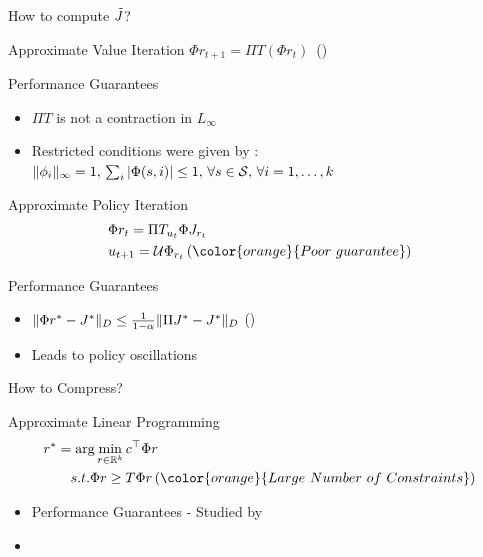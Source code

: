 \documentclass[10pt,handout]{beamer}
\begin{document}
\begin{frame}[fragile]{How to compute $\tilde{J}$?}

 Approximate Value Iteration{\color{orange}} $\Phi r_{t+1}= \Pi T (\Phi r_t)$ \,({\color{orange}{No fixed point}})

\begin{block}{Performance Guarantees}
\begin{itemize}
\item $\Pi T$ is not a contraction in $L_\infty$
\item Restricted conditions were given by \cite{melo2007q}:
$\|\phi_i\|_\infty=1,\, \sum_i |\Phi(s,i)|\leq 1,\,\forall s\in \mathcal{S}, \,\forall i=1,\ldots,k$
\end{itemize}
\end{block}


{Approximate Policy Iteration}{\color{orange}}
\begin{align*}
&\Phi r_t=\Pi T_{u_t} \Phi J_{r_t} \\
&u_{t+1}=\U \Phi_{r_t}\,\text({\color{orange}{Poor~guarantee}})
\end{align*}

\begin{block}{Performance Guarantees}
\begin{itemize}
\item $\|\Phi r^*-J^*\|_D\leq \frac{1}{1-\alpha}\|\Pi J^*-J^*\|_D$ ({\color{orange}{Norm Mismatch}})
\item Leads to policy oscillations
\end{itemize}
\end{block}



\end{frame}

\begin{frame}[fragile]{How to Compress?}
\begin{block}{Approximate Linear Programming{\color{orange}}}
\begin{align*}
 r^*&=\arg\min_{r\in \R^{k}} c^\top \Phi r\\
&\quad s.t. \Phi r\geq T \Phi r \,({\color{orange}{Large~Number~of~Constraints}})
\end{align*}
\end{block}
\begin{itemize}
\item Performance Guarantees - Studied by \cite{de2003linear}
\item {\color{orange}{What happens if we reduce constraints?}}
\end{itemize}
\end{frame}
\end{document}
